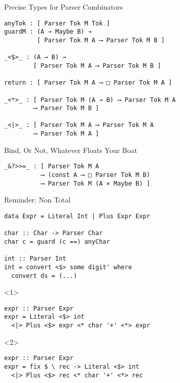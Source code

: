 \documentclass{beamer}
\begin{document}
\begin{frame}[fragile]{Precise Types for Parser Combinators}
\begin{verbatim}
anyTok : [ Parser Tok M Tok ]
guardM : (A → Maybe B) →
         [ Parser Tok M A ⟶ Parser Tok M B ]

_<$>_ : (A → B) → 
        [ Parser Tok M A ⟶ Parser Tok M B ]

return : [ Parser Tok M A ⟶ □ Parser Tok M A ]

_<*>_ : [ Parser Tok M (A → B) ⟶ Parser Tok M A
        ⟶ Parser Tok M B ]

_<|>_ : [ Parser Tok M A ⟶ Parser Tok M A
        ⟶ Parser Tok M A ]
\end{verbatim}
\end{frame}

\begin{frame}[fragile]{Bind, Or Not, Whatever Floats Your Boat}
\begin{verbatim}
_&?>>=_ : [ Parser Tok M A
          ⟶ (const A ⟶ □ Parser Tok M B)
          ⟶ Parser Tok M (A × Maybe B) ]
\end{verbatim}
\end{frame}

\begin{frame}[fragile]{Reminder: Non Total}
\begin{verbatim}
data Expr = Literal Int | Plus Expr Expr

char :: Char -> Parser Char
char c = guard (c ==) anyChar

int :: Parser Int
int = convert <$> some digit' where
  convert ds = (...)
\end{verbatim}

\begin{onlyenv}<1>
\begin{mdframed}[backgroundcolor=lightgray]
\begin{verbatim}
expr :: Parser Expr
expr = Literal <$> int
  <|> Plus <$> expr <* char '+' <*> expr
\end{verbatim}
\end{mdframed}
\end{onlyenv}
\begin{onlyenv}<2>
\begin{mdframed}[backgroundcolor=lightgray]
\begin{verbatim}
expr :: Parser Expr
expr = fix $ \ rec -> Literal <$> int
  <|> Plus <$> rec <* char '+' <*> rec
\end{verbatim}
\end{mdframed}
\end{onlyenv}

\end{frame}
\end{document}
